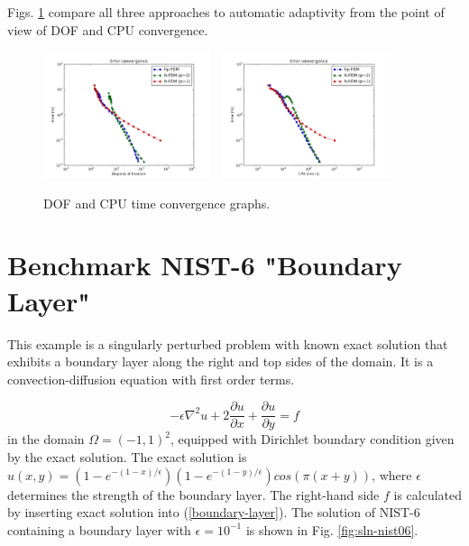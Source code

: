 \documentclass[12pt]{elsarticle}
\begin{document}
Figs. \ref{fig:nist-5-conv} compare all
three approaches to automatic adaptivity from the point
of view of DOF and CPU convergence.

\begin{figure}[H]
\centering
\vspace{-5mm}
\includegraphics[height=3.7cm]{nist/nist-5/conv_dof_aniso.png}\ \
\includegraphics[height=3.7cm]{nist/nist-5/conv_cpu_aniso.png}
\vspace{-5mm}
\caption{DOF and CPU time convergence graphs.}
\label{fig:nist-5-conv}
\vspace{-5mm}
\end{figure}


\section{Benchmark NIST-6 "Boundary Layer"}
\label{sec:bench-6}

This example is a singularly perturbed problem with known exact solution that exhibits
a boundary layer along the right and top sides of the domain.
It is a convection-diffusion equation with first order terms.

\begin{equation} \label{boundary-layer}
-\epsilon \nabla^{2} u + 2\frac{\partial u}{\partial x} + \frac{\partial u}{\partial y} = f
\end{equation}
in the domain $\Omega = (-1, 1)^2$, equipped with Dirichlet boundary condition
given by the exact solution. The exact solution is
$u(x,y) = (1 - e^{-(1 - x) / \epsilon})(1 - e^{-(1 - y) / \epsilon})cos(\pi (x + y))$,
where $\epsilon$ determines the strength of the boundary layer.
The right-hand side $f$ is calculated by inserting exact solution into (\ref{boundary-layer}).
The solution of NIST-6 containing a boundary layer
with $\epsilon = 10^{-1}$ is shown in Fig. \ref{fig:sln-nist06}.
\end{document}
